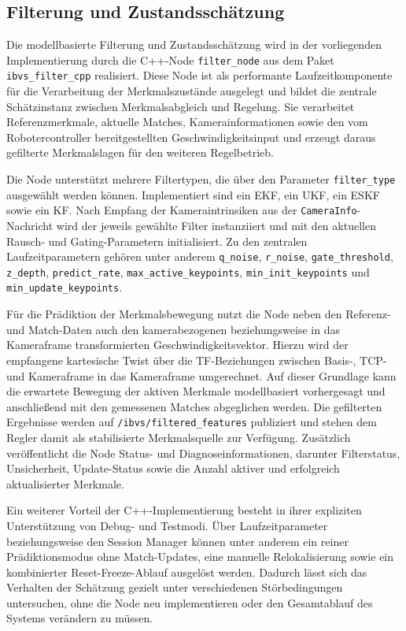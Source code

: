 \subsection{Filterung und Zustandsschätzung}
\label{sec:implementierung_filterung_zustandsschaetzung}

Die modellbasierte Filterung und Zustandsschätzung wird in der vorliegenden Implementierung durch die C++-Node \texttt{filter\_node} aus dem Paket \texttt{ibvs\_filter\_cpp} realisiert. Diese Node ist als performante Laufzeitkomponente für die Verarbeitung der Merkmalszustände ausgelegt und bildet die zentrale Schätzinstanz zwischen Merkmalsabgleich und Regelung. Sie verarbeitet Referenzmerkmale, aktuelle Matches, Kamerainformationen sowie den vom Robotercontroller bereitgestellten Geschwindigkeitsinput und erzeugt daraus gefilterte Merkmalslagen für den weiteren Regelbetrieb. 

Die Node unterstützt mehrere Filtertypen, die über den Parameter \texttt{filter\_type} ausgewählt werden können. Implementiert sind ein \ac{EKF}, ein \ac{UKF}, ein \ac{ESKF} sowie ein \ac{KF}. Nach Empfang der Kameraintrinsiken aus der \texttt{CameraInfo}-Nachricht wird der jeweils gewählte Filter instanziiert und mit den aktuellen Rausch- und Gating-Parametern initialisiert. Zu den zentralen Laufzeitparametern gehören unter anderem \texttt{q\_noise}, \texttt{r\_noise}, \texttt{gate\_threshold}, \texttt{z\_depth}, \texttt{predict\_rate}, \texttt{max\_active\_keypoints}, \texttt{min\_init\_keypoints} und \texttt{min\_update\_keypoints}. 

Für die Prädiktion der Merkmalsbewegung nutzt die Node neben den Referenz- und Match-Daten auch den kamerabezogenen beziehungsweise in das Kameraframe transformierten Geschwindigkeitsvektor. Hierzu wird der empfangene kartesische Twist über die \ac{TF}-Beziehungen zwischen Basis-, \ac{TCP}- und Kameraframe in das Kameraframe umgerechnet. Auf dieser Grundlage kann die erwartete Bewegung der aktiven Merkmale modellbasiert vorhergesagt und anschließend mit den gemessenen Matches abgeglichen werden. Die gefilterten Ergebnisse werden auf \texttt{/ibvs/filtered\_features} publiziert und stehen dem Regler damit als stabilisierte Merkmalsquelle zur Verfügung. Zusätzlich veröffentlicht die Node Status- und Diagnoseinformationen, darunter Filterstatus, Unsicherheit, Update-Status sowie die Anzahl aktiver und erfolgreich aktualisierter Merkmale. 

Ein weiterer Vorteil der C++-Implementierung besteht in ihrer expliziten Unterstützung von Debug- und Testmodi. Über Laufzeitparameter beziehungsweise den Session Manager können unter anderem ein reiner Prädiktionsmodus ohne Match-Updates, eine manuelle Relokalisierung sowie ein kombinierter Reset-Freeze-Ablauf ausgelöst werden. Dadurch lässt sich das Verhalten der Schätzung gezielt unter verschiedenen Störbedingungen untersuchen, ohne die Node neu implementieren oder den Gesamtablauf des Systems verändern zu müssen. 
